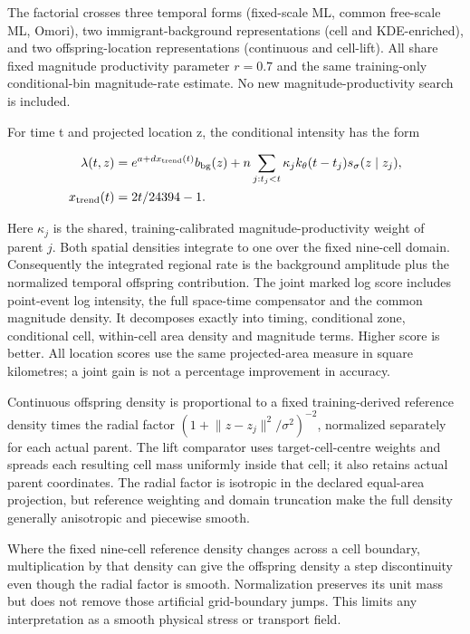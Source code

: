 The factorial crosses three temporal forms (fixed-scale ML, common free-scale ML, Omori), two immigrant-background representations (cell and KDE-enriched), and two offspring-location representations (continuous and cell-lift). All share fixed magnitude productivity parameter $r=0.7$ and the same training-only conditional-bin magnitude-rate estimate. No new magnitude-productivity search is included.

For time t and projected location z, the conditional intensity has the form

\begin{align}
\lambda(t,z)&=e^{a+dx_{\mathrm{trend}}(t)}b_{\rm bg}(z)+n\sum_{j:t_j<t}\kappa_j k_\theta(t-t_j)s_\sigma(z\mid z_j),\\
x_{\mathrm{trend}}(t)&=2t/24394-1.
\end{align}

Here \(\kappa_j\) is the shared, training-calibrated magnitude-productivity weight of parent \(j\). Both spatial densities integrate to one over the fixed nine-cell domain. Consequently the integrated regional rate is the background amplitude plus the normalized temporal offspring contribution. The joint marked log score includes point-event log intensity, the full space-time compensator and the common magnitude density. It decomposes exactly into timing, conditional zone, conditional cell, within-cell area density and magnitude terms. Higher score is better. All location scores use the same projected-area measure in square kilometres; a joint gain is not a percentage improvement in accuracy.

Continuous offspring density is proportional to a fixed training-derived reference density times the radial factor $(1+\lVert z-z_j\rVert^2/\sigma^2)^{-2}$, normalized separately for each actual parent. The lift comparator uses target-cell-centre weights and spreads each resulting cell mass uniformly inside that cell; it also retains actual parent coordinates. The radial factor is isotropic in the declared equal-area projection, but reference weighting and domain truncation make the full density generally anisotropic and piecewise smooth.

Where the fixed nine-cell reference density changes across a cell boundary, multiplication by that density can give the offspring density a step discontinuity even though the radial factor is smooth. Normalization preserves its unit mass but does not remove those artificial grid-boundary jumps. This limits any interpretation as a smooth physical stress or transport field.

